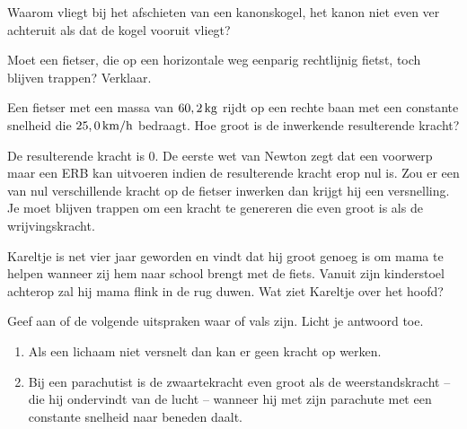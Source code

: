 \documentclass{ximera}
\begin{document}
\begin{exercise} Waarom vliegt bij het afschieten van een kanonskogel, het kanon niet even ver achteruit als dat de kogel vooruit vliegt?


\end{exercise}

\begin{exercise} Moet een fietser, die op een horizontale weg eenparig rechtlijnig fietst, toch blijven trappen? Verklaar.

\end{exercise}

\begin{exercise} Een fietser met een massa van $60,2\rm\,kg$ rijdt op een rechte baan met een constante snelheid die $25,0\rm\,km/h$ bedraagt. Hoe groot is de inwerkende resulterende kracht? 
\begin{oplossing}
De resulterende kracht is 0. De eerste wet van Newton zegt dat een voorwerp maar een ERB kan uitvoeren indien de resulterende kracht erop nul is. Zou er een van nul verschillende kracht op de fietser inwerken dan krijgt hij een versnelling. Je moet blijven trappen om een kracht te genereren die even groot is als de wrijvingskracht.
\end{oplossing}

\end{exercise}

\begin{exercise} Kareltje is net vier jaar geworden en vindt dat hij groot genoeg is om mama te helpen wanneer zij hem naar school brengt met de fiets. Vanuit zijn kinderstoel achterop zal hij mama flink in de rug duwen. Wat ziet Kareltje over het hoofd? 

\end{exercise}

\begin{exercise} Geef aan of de volgende uitspraken waar of vals zijn. Licht je antwoord toe.
\begin{enumerate}
\item Als een lichaam niet versnelt dan kan er geen kracht op werken. 
\item Bij een parachutist is de zwaartekracht even groot als de weerstandskracht -- die hij ondervindt van de lucht -- wanneer hij met zijn parachute met een constante snelheid naar beneden daalt. 
\end{enumerate}


\end{exercise}
\end{document}
